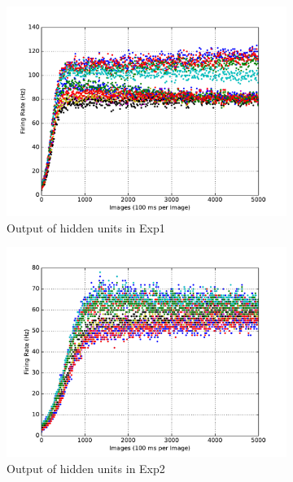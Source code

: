 \begin{figure}
\begin{subfigure}[t]{0.4\textwidth}
		\includegraphics[width=\textwidth]{pics_sdlm/03_exp_SAE_noise_long/exp1_hid_s.pdf}
		\caption{Output of hidden units in Exp1}
	\end{subfigure}
	\begin{subfigure}[t]{0.4\textwidth}
		\includegraphics[width=\textwidth]{pics_sdlm/03_exp_SAE_noise_long/exp2_hid_s.pdf}
		\caption{Output of hidden units in Exp2}
	\end{subfigure}\\
	\begin{subfigure}[t]{0.4\textwidth}

\end{subfigure}
\end{figure}
